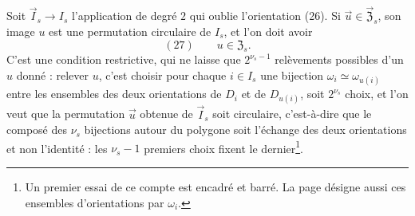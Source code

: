 \documentclass[11pt,a4paper]{article}
\begin{document}
Soit $\vec{I}_s \to I_s$ l'application de degré $2$ qui oublie l'orientation
(26). Si $\vec{u} \in \vec{\mathfrak{Z}}_s$, son image $u$ est une
permutation circulaire de $I_s$, et l'on doit avoir
\[
(27) \qquad u \in \mathfrak{Z}_s .
\]
C'est une condition restrictive, qui ne laisse que $2^{\nu_s - 1}$ relèvements
possibles d'un $u$ donné : relever $u$, c'est choisir pour chaque $i \in I_s$
une bijection $\omega_i \simeq \omega_{u(i)}$ entre les ensembles des deux
orientations de $D_i$ et de $D_{u(i)}$, soit $2^{\nu_s}$ choix, et l'on veut
que la permutation $\vec{u}$ obtenue de $\vec{I}_s$ soit circulaire,
c'est-à-dire que le composé des $\nu_s$ bijections autour du polygone soit
l'échange des deux orientations et non l'identité : les $\nu_s - 1$ premiers
choix fixent le dernier\footnote{Un premier essai de ce compte est encadré et
barré. La page désigne aussi ces ensembles d'orientations par $\omega_i$.}.
\end{document}
